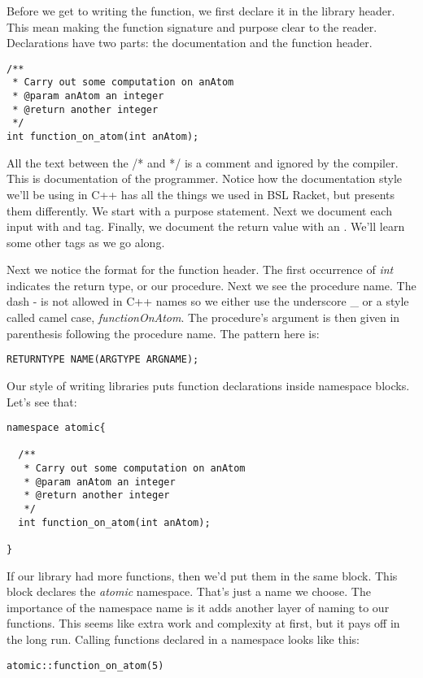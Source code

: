 \documentclass[]{tufte-handout}
\begin{document}
Before we get to writing the function, we first declare it in the library header. This mean making the function signature and purpose clear to the reader.  Declarations have two parts: the documentation and the function header. 
\begin{verbatim}
/**
 * Carry out some computation on anAtom
 * @param anAtom an integer
 * @return another integer
 */
int function_on_atom(int anAtom);

\end{verbatim}
All the text between the /* and */ is a comment and ignored by the compiler.  This is documentation of the programmer. Notice how the documentation style we'll be using in C++ has all the things we used in BSL Racket, but presents them differently. We start with a purpose statement. Next we document each input with and \@param tag. Finally, we document the return value with an \@return.  We'll learn some other tags as we go along. 

Next we notice the format for the function header. The first occurrence of \textit{int} indicates the return type, or our procedure. Next we see the procedure name. The dash - is not allowed in C++ names so we either use the underscore \_ or a style called camel case, \textit{functionOnAtom}. The procedure's argument is then given in parenthesis following the procedure name. The pattern here is:
\begin{verbatim}
RETURNTYPE NAME(ARGTYPE ARGNAME);
\end{verbatim} 


Our style of writing libraries puts function declarations inside namespace blocks. Let's see that:
\begin{verbatim}
namespace atomic{

  /**
   * Carry out some computation on anAtom
   * @param anAtom an integer
   * @return another integer
   */
  int function_on_atom(int anAtom);

}
\end{verbatim}
If our library had more functions, then we'd put them in the same block. This block declares the \textit{atomic} namespace.  That's just a name we choose.  The importance of the namespace name is it adds another layer of naming to our functions. This seems like extra work and complexity at first, but it pays off in the long run. Calling functions declared in a namespace looks like this:
\begin{verbatim}
atomic::function_on_atom(5)
\end{verbatim}
\end{document}
